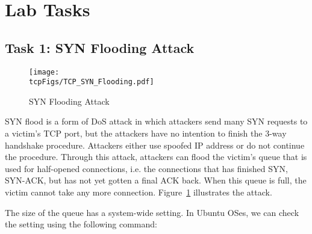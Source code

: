 
 








\section{Lab Tasks}


\subsection {Task 1: SYN Flooding Attack}


\begin{figure}[htb]
  \begin{center}
    \texttt{[image: \\tcpFigs/TCP\_SYN\_Flooding.pdf]}
  \end{center}
  \caption{SYN Flooding Attack}
  \label{tcp:fig:synflooding}
\end{figure}
 


SYN flood is a form of DoS attack in which attackers send many SYN
requests to a victim's TCP port, but the attackers have no intention 
to finish the 3-way handshake procedure. Attackers either use spoofed 
IP address or do not continue the procedure. 
Through this attack, attackers can flood the victim's queue that is 
used for half-opened connections, i.e. the connections that has finished SYN, SYN-ACK, 
but has not yet gotten a final ACK back. When this queue is full, 
the victim cannot take any more connection. Figure~\ref{tcp:fig:synflooding}
illustrates the attack.

The size of the queue has a system-wide setting.  In Ubuntu OSes, we can check the
setting using the following command: 

